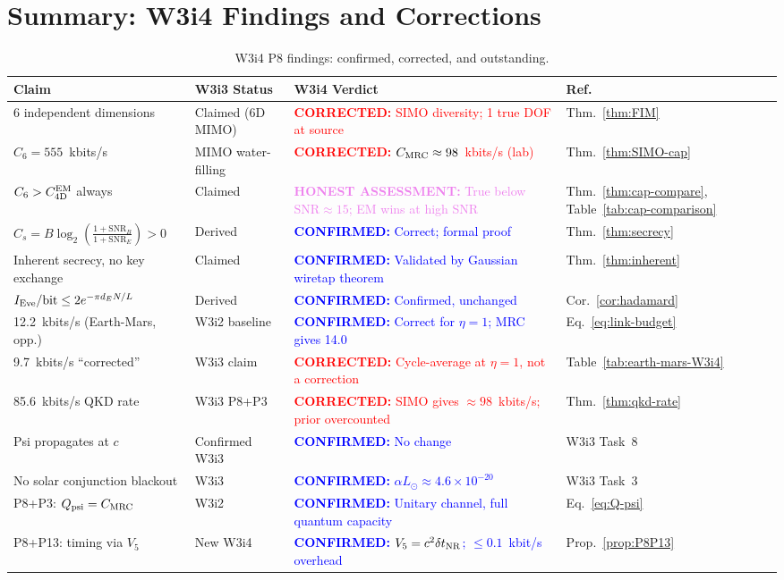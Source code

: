 \documentclass[aps,prd,twocolumn,superscriptaddress,nofootinbib]{revtex4-2}
\newcommand{\SNR}{\mathrm{SNR}}
\newcommand{\confirmed}[1]{\textcolor{blue}{\textbf{CONFIRMED:} #1}}
\newcommand{\corrected}[1]{\textcolor{red}{\textbf{CORRECTED:} #1}}
\newcommand{\honest}[1]{\textcolor{violet}{\textbf{HONEST ASSESSMENT:} #1}}
\begin{document}
\section{Summary: W3i4 Findings and Corrections}
\label{sec:summary}

\begin{table}[h]
\centering
\caption{W3i4 P8 findings: confirmed, corrected, and outstanding.}
\begin{tabular}{p{3.5cm}p{4cm}p{4.5cm}l}
\hline\hline
Claim & W3i3 Status & W3i4 Verdict & Ref. \\
\hline
6 independent dimensions & Claimed (6D MIMO) & \corrected{SIMO diversity; 1 true DOF at source} & Thm.~\ref{thm:FIM} \\
$C_6 = 555$~kbits/s & MIMO water-filling & \corrected{$C_{\rm MRC} \approx 98$~kbits/s (lab)} & Thm.~\ref{thm:SIMO-cap} \\
$C_6 > C_{\rm 4D}^{\rm EM}$ always & Claimed & \honest{True below $\SNR \approx 15$; EM wins at high SNR} & Thm.~\ref{thm:cap-compare}, Table~\ref{tab:cap-comparison} \\
$C_s = B\log_2\!\left(\frac{1+\SNR_B}{1+\SNR_E}\right) > 0$ & Derived & \confirmed{Correct; formal proof} & Thm.~\ref{thm:secrecy} \\
Inherent secrecy, no key exchange & Claimed & \confirmed{Validated by Gaussian wiretap theorem} & Thm.~\ref{thm:inherent} \\
$I_{\rm Eve}/\text{bit} \leq 2e^{-\pi d_E N/L}$ & Derived & \confirmed{Confirmed, unchanged} & Cor.~\ref{cor:hadamard} \\
12.2~kbits/s (Earth-Mars, opp.) & W3i2 baseline & \confirmed{Correct for $\eta=1$; MRC gives 14.0} & Eq.~\eqref{eq:link-budget} \\
9.7~kbits/s ``corrected'' & W3i3 claim & \corrected{Cycle-average at $\eta=1$, not a correction} & Table~\ref{tab:earth-mars-W3i4} \\
85.6~kbits/s QKD rate & W3i3 P8+P3 & \corrected{SIMO gives $\approx 98$~kbits/s; prior overcounted} & Thm.~\ref{thm:qkd-rate} \\
Psi propagates at $c$ & Confirmed W3i3 & \confirmed{No change} & W3i3 Task~8 \\
No solar conjunction blackout & W3i3 & \confirmed{$\alpha L_\odot \approx 4.6\times10^{-20}$} & W3i3 Task~3 \\
P8+P3: $Q_{\rm psi} = C_{\rm MRC}$ & W3i2 & \confirmed{Unitary channel, full quantum capacity} & Eq.~\eqref{eq:Q-psi} \\
P8+P13: timing via $V_5$ & New W3i4 & \confirmed{$V_5 = c^2 \delta t_{\rm NR}$; $\leq 0.1$~kbit/s overhead} & Prop.~\ref{prop:P8P13} \\
\hline\hline
\end{tabular}
\label{tab:W3i4-summary}
\end{table}
\end{document}
